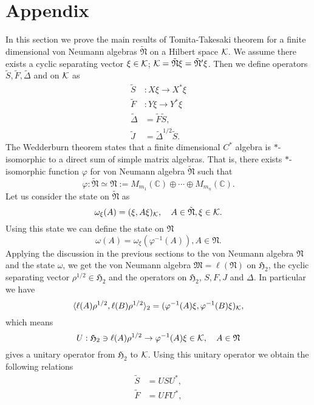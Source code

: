 \section{Appendix}
In this section we prove the main results of Tomita-Takesaki theorem for a finite dimensional
von Neumann algebras $\tilde{\mathfrak{N}}$ on a Hilbert space $\cal{K}$.
We assume there exists a cyclic separating vector $\xi\in \cal{K}$;
$\cal{K}=\tilde{\mathfrak{N}}\xi=\tilde{\mathfrak{N}}^\prime\xi$.
Then we define operators $\tilde{S},\tilde{F},\tilde{\Delta}$ and  on $\cal{K}$ as
\begin{equation}
\begin{split}
\tilde{S}&:X\xi \to X^\ast \xi \\
\tilde{F}&:Y\xi \to Y^\ast \xi \\
\tilde{\Delta}&=\tilde{F}\tilde{S},\\
\tilde{J}&=\tilde{\Delta}^{1/2}\tilde{S}.
\end{split}
\end{equation}
The Wedderburn theorem states that a finite dimensional $C^{\ast}$ algebra is  $\ast$-isomorphic to a direct sum of simple matrix algebras. That is, there exists $\ast$-isomorphic function $\varphi$ for von Neumann algebra $\tilde{\mathfrak{N}}$ such that
$$
\varphi:\tilde{\mathfrak{N}}\simeq \mathfrak{N}:=M_{m_1}(\mathbb{C})\oplus \cdots \oplus M_{m_n}(\mathbb{C}).
$$
Let us consider the state on $\tilde{\mathfrak{N}}$ as
$$
\omega_\xi(A)=(\xi,A\xi)_{\cal K},\quad A\in \tilde{\mathfrak{N}},\xi\in \cal{K}.
$$
Using this state we can define the state on $\mathfrak{N}$
$$
\omega(A)=\omega_\xi(\varphi^{-1}(A)),A\in \mathfrak{N}.
$$
Applying the discussion in the previous sections to the von Neumann algebra $\mathfrak{N}$ and the state
$\omega$, we get
the von Neumann algebra $\mathfrak{M}=\ell (\mathfrak{N})$ on  
$\mathfrak{H}_2$, the cyclic separating vector $\rho^{1/2}\in \mathfrak{H}_2$
and the operators on $\mathfrak{H}_2$, $S, F, J$ and $\Delta$.
In particular we have
$$
\langle \ell(A)\rho^{1/2},\ell( B)\rho^{1/2}\rangle_2=(\varphi^{-1}(A)\xi,\varphi^{-1}(B)\xi)_{\cal K},
$$
which means
$$
U:\mathfrak{H}_2\ni\ell(A)\rho^{1/2}\to \varphi^{-1}(A)\xi\in {\cal K}, \quad A\in \mathfrak{N}
$$
gives a unitary operator from $\mathfrak{H}_2$ to ${\cal K}$.
Using this unitary operator we obtain the following relations
\begin{equation}
\begin{split}
\tilde{S}&=US U^{\ast},\\
\tilde{F}&=UFU^\ast ,
\end{split}
\end{equation}
